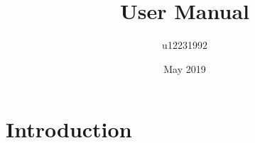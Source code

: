 \documentclass{article}
\title{User Manual}
\author{u12231992 }
\date{May 2019}
\begin{document}
\maketitle

\section{Introduction}
\end{document}
